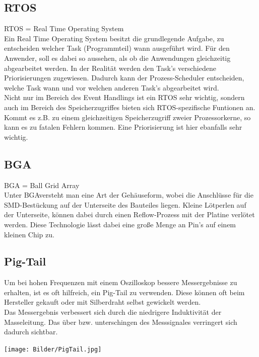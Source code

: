 \subsection{RTOS}
RTOS = Real Time Operating System
\\
Ein \glqq Real Time Operating System \grqq{} besitzt die grundlegende Aufgabe, zu entscheiden welcher Task (Programmteil) wann ausgeführt wird. Für den Anwender, soll es dabei so aussehen, als ob die Anwendungen gleichzeitig abgearbeitet werden. In der Realität werden den Task's verschiedene Priorisierungen zugewiesen. Dadurch kann der Prozess-Scheduler entscheiden, welche Task wann und vor welchen anderen Task's abgearbeitet wird. 
\\
Nicht nur im Bereich des \glqq Event Handlings \grqq{} ist ein RTOS sehr wichtig, sondern auch im Bereich des Speicherzugriffes bieten sich RTOS-spezifische Funtionen an. Kommt es z.B. zu einem gleichzeitigen Speicherzugriff zweier Prozessorkerne, so kann es zu fatalen Fehlern kommen. Eine Priorisierung ist hier ebanfalls sehr wichtig.

\newpage
\subsection{BGA}
BGA = Ball Grid Array
\\
Unter \glqq BGA\grqq versteht man eine Art der Gehäuseform, wobei die Anschlüsse für die SMD-Bestückung auf der Unterseite des Bauteiles liegen. Kleine Lötperlen auf der Unterseite, können dabei durch einen Reflow-Prozess mit der Platine verlötet werden. Diese Technologie lässt dabei eine große Menge an Pin's auf einem kleinen Chip zu. 


\subsection{Pig-Tail}
Um bei hohen Frequenzen mit einem Oszilloskop bessere Messergebnisse zu erhalten, ist es oft hilfreich, ein Pig-Tail zu verwenden. Diese können oft beim Hersteller gekauft oder mit Silberdraht selbst gewickelt werden. 
\\
Das Messergebnis verbessert sich durch die niedrigere Induktivität der Masseleitung. Das über bzw. unterschingen des Messsignales verringert sich dadurch sichtbar. 


\begin{center}

\texttt{[image: Bilder/PigTail.jpg]}


\end{center}


